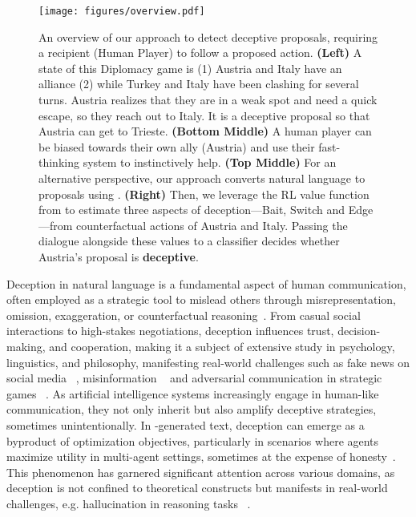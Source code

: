 \begin{figure*}[h]
    \centering
    \texttt{[image: figures/overview.pdf]}
    \caption{An overview of our approach to detect deceptive proposals, requiring a recipient (Human Player) to follow a proposed action. \textbf{(Left)} A state of this Diplomacy game is (1) \textcolor{aus}{Austria} and \textcolor{ita}{Italy} have an alliance (2) while \textcolor{tur}{Turkey} and \textcolor{ita}{Italy} have been clashing for several turns. \textcolor{aus}{Austria} realizes that they are in a weak spot and need a quick escape, so they reach out to \textcolor{ita}{Italy}. It is a deceptive proposal so that \textcolor{aus}{Austria} can get to Trieste. \textbf{(Bottom Middle)} A human player can be biased towards their own ally (\textcolor{aus}{Austria}) and use their fast-thinking system to instinctively help. \textbf{(Top Middle)}  For an alternative perspective, our approach converts natural language to proposals using . \textbf{(Right)} Then, we leverage the RL value function from \cicero to estimate three aspects of deception---Bait, Switch and Edge---from counterfactual actions of \textcolor{aus}{Austria} and \textcolor{ita}{Italy}. 
    Passing the dialogue alongside these values to a classifier decides whether \textcolor{aus}{Austria}'s proposal is \textbf{deceptive}.}
    \label{fig:overview}
\end{figure*}


Deception in natural language is a fundamental aspect of human communication, often employed as a strategic tool to mislead others through misrepresentation, omission, exaggeration, or counterfactual reasoning~\citep{bok2011lying}. 
From casual social interactions to high-stakes negotiations, deception influences trust, decision-making, and cooperation, making it a subject of extensive study in psychology, linguistics, and philosophy, manifesting real-world challenges such as fake news on
social media ~\citep{bade-etal-2024-social}, misinformation ~\citep{panda-levitan-2022-improving} and adversarial communication in strategic
games ~\citep{bernard-mickus-2023-many}. As artificial intelligence systems increasingly engage in human-like communication, they not only inherit but also amplify deceptive strategies, sometimes unintentionally.
%
In -generated text, deception can emerge as a byproduct of
optimization objectives, particularly in  scenarios where
agents maximize utility in multi-agent settings, sometimes at the
expense of honesty~\cite{wen2025language}.
%
This phenomenon has garnered significant attention across various
domains, as  deception is not confined to theoretical
constructs but manifests in real-world challenges, e.g. hallucination in reasoning tasks ~\citep{grover-etal-2024-navigating}.


